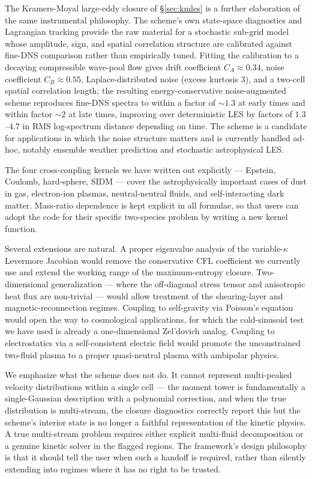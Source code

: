 \documentclass[11pt,letterpaper]{article}
\begin{document}
The Kramers-Moyal large-eddy closure of \S\ref{sec:kmles} is a further elaboration of the same instrumental philosophy. The scheme's own state-space diagnostics and Lagrangian tracking provide the raw material for a stochastic sub-grid model whose amplitude, sign, and spatial correlation structure are calibrated against fine-DNS comparison rather than empirically tuned. Fitting the calibration to a decaying compressible wave-pool flow gives drift coefficient $C_A \approx 0.34$, noise coefficient $C_B \approx 0.55$, Laplace-distributed noise (excess kurtosis 3), and a two-cell spatial correlation length; the resulting energy-conservative noise-augmented scheme reproduces fine-DNS spectra to within a factor of $\sim 1.3$ at early times and within factor $\sim 2$ at late times, improving over deterministic LES by factors of $1.3$--$4.7$ in RMS log-spectrum distance depending on time. The scheme is a candidate for applications in which the noise structure matters and is currently handled ad-hoc, notably ensemble weather prediction and stochastic astrophysical LES.

The four cross-coupling kernels we have written out explicitly --- Epstein, Coulomb, hard-sphere, SIDM --- cover the astrophysically important cases of dust in gas, electron-ion plasmas, neutral-neutral fluids, and self-interacting dark matter. Mass-ratio dependence is kept explicit in all formulae, so that users can adopt the code for their specific two-species problem by writing a new kernel function.

Several extensions are natural. A proper eigenvalue analysis of the variable-$\kappa$ Levermore Jacobian would remove the conservative CFL coefficient we currently use and extend the working range of the maximum-entropy closure. Two-dimensional generalization --- where the off-diagonal stress tensor and anisotropic heat flux are non-trivial --- would allow treatment of the shearing-layer and magnetic-reconnection regimes. Coupling to self-gravity via Poisson's equation would open the way to cosmological applications, for which the cold-sinusoid test we have used is already a one-dimensional Zel'dovich analog. Coupling to electrostatics via a self-consistent electric field would promote the unconstrained two-fluid plasma to a proper quasi-neutral plasma with ambipolar physics.

We emphasize what the scheme does not do. It cannot represent multi-peaked velocity distributions within a single cell --- the moment tower is fundamentally a single-Gaussian description with a polynomial correction, and when the true distribution is multi-stream, the closure diagnostics correctly report this but the scheme's interior state is no longer a faithful representation of the kinetic physics. A true multi-stream problem requires either explicit multi-fluid decomposition or a genuine kinetic solver in the flagged regions. The framework's design philosophy is that it should tell the user when such a handoff is required, rather than silently extending into regimes where it has no right to be trusted.
\end{document}
